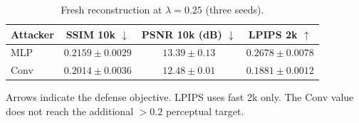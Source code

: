 \begin{table}[t]
\centering
\caption{Fresh reconstruction at $\lambda=0.25$ (three seeds).}
\label{tab:reconstruction}
\footnotesize
\setlength{\tabcolsep}{4pt}
\begin{tabular}{@{}lccc@{}}
\toprule
Attacker & SSIM 10k $\downarrow$ & PSNR 10k (dB) $\downarrow$ & LPIPS 2k $\uparrow$ \\
\midrule
MLP & $0.2159\pm 0.0029$ & $13.39\pm 0.13$ & $0.2678\pm 0.0078$ \\
Conv & $0.2014\pm 0.0036$ & $12.48\pm 0.01$ & $0.1881\pm 0.0012$ \\
\bottomrule
\end{tabular}
\par\vspace{2pt}\begin{minipage}{\linewidth}\footnotesize Arrows indicate the defense objective. LPIPS uses fast 2k only. The Conv value does not reach the additional $>0.2$ perceptual target.\end{minipage}
\end{table}
